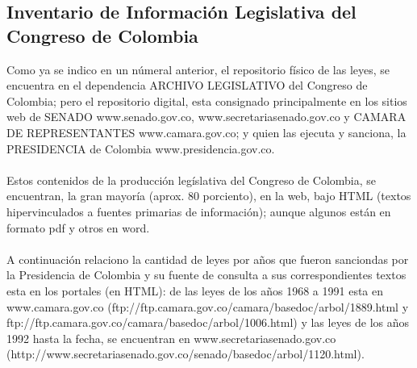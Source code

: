 \documentclass[conference]{IEEEtran}\usepackage[]{graphicx}\usepackage[]{color}
\begin{document}
\subsection{Inventario de Información Legislativa del Congreso de Colombia}   

Como ya se indico en un númeral anterior, el repositorio físico de las leyes, se encuentra en el dependencia ARCHIVO LEGISLATIVO del Congreso de Colombia; pero el repositorio digital, esta consignado principalmente en los sitios web de SENADO www.senado.gov.co, www.secretariasenado.gov.co y CAMARA DE REPRESENTANTES www.camara.gov.co; y quien las ejecuta y sanciona, la PRESIDENCIA de Colombia www.presidencia.gov.co.  \\ \\
Estos contenidos de la producción legíslativa del Congreso de Colombia, se encuentran, la gran mayoría (aprox. 80 porciento), en la web, bajo HTML (textos hipervinculados a fuentes primarias de información); aunque algunos están en formato pdf y otros en word.\\ \\
A continuación relaciono la cantidad de leyes por años que fueron sanciondas por la Presidencia de Colombia y su fuente de consulta a sus correspondientes textos esta en los portales (en HTML): de las leyes de los años 1968 a 1991 esta en www.camara.gov.co (ftp://ftp.camara.gov.co/camara/basedoc/arbol/1889.html y ftp://ftp.camara.gov.co/camara/basedoc/arbol/1006.html) y las leyes de los años 1992 hasta la fecha, se encuentran en www.secretariasenado.gov.co (http://www.secretariasenado.gov.co/senado/basedoc/arbol/1120.html). \\
\end{document}
